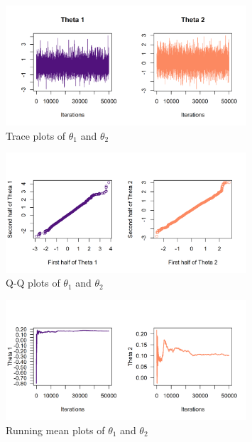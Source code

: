 \documentclass[12pt]{article}
\begin{document}
\begin{figure}[H]
    \centering    \includegraphics[width=0.8\textwidth]{pictures/fig01-mh-traceplot.png}
    \caption{Trace plots of \( \theta_1 \) and \( \theta_2 \)}
    \label{fig:mh-traceplot}
\end{figure}

\begin{figure}[H]
    \centering    \includegraphics[width=0.8\textwidth]{pictures/fig03-mh-qqplots.png}
    \caption{Q-Q plots of \( \theta_1 \) and \( \theta_2 \)}
    \label{fig:mh-qqplot}
\end{figure}

\begin{figure}[H]
    \centering    \includegraphics[width=0.8\textwidth]{pictures/fig04-mh-runmean.png}
    \caption{Running mean plots of \( \theta_1 \) and \( \theta_2 \)}
    \label{fig:mh-runmean}
\end{figure}
\end{document}
